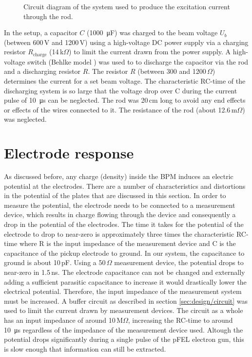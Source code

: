 \begin{figure}[h]
\centering

\caption{Circuit diagram of the system used to produce the excitation current through the rod.}
\label{fig:circuitsetup}
\end{figure}

In the setup, a capacitor $C$ (\SI{1000}{\micro\farad}) was charged to the beam voltage $U_b$ (between 600\,V and 1200\,V) using a high-voltage DC power supply via a charging resistor $R_\text{charge}$ (14\,k$\Omega$) to limit the current drawn from the power supply.
A high-voltage switch (Behlke model ) was used to to discharge the capacitor via the rod and a discharging resistor $R$. The resistor $R$ (between 300 and 1200\,$\Omega$) determines the current for a set beam voltage.
The characteristic RC-time of the discharging system is so large that the voltage drop over C during the current pulse of \SI{10}{\micro\second} can be neglected.
The rod was 20\,cm long to avoid any end effects or effects of the wires connected to it. The resistance of the rod (about 12.6\,m$\Omega$) was neglected.

%
\section{Electrode response}
\label{sec:calibration/signal}
As discussed before, any charge (density) inside the BPM induces an electric potential at the electrodes. There are a number of characteristics and distortions in the potential of the plates that are discussed in this section.
In order to measure the potential, the electrode needs to be connected to a measurement device, which results in charge flowing through the device and consequently a drop in the potential of the electrodes.
The time it takes for the potential of the electrode to drop to near-zero is approximately three times the characteristic RC-time where R is the input impedance of the measurement device and C is the capacitance of the pickup electrode to ground. In our system, the capacitance to ground is about 10\,pF. Using a 50\,$\Omega$ measurement device, the potential drops to near-zero in 1.5\,ns.
The electrode capacitance can not be changed and externally adding a sufficient parasitic capacitance to increase it would drastically lower the electrical potential. Therefore, the input impedance of the measurement system must be increased.
A buffer circuit as described in section \ref{sec:design/circuit} was used to limit the current drawn by measurement devices. The circuit as a whole has an input impedance of around 10\,M$\Omega$, increasing the RC-time to around \SI{10}{\micro\second} regardless of the impedance of the measurement device used.
Altough the potential drops significantly during a single pulse of the pFEL electron gun, this is slow enough that information can still be extracted.

